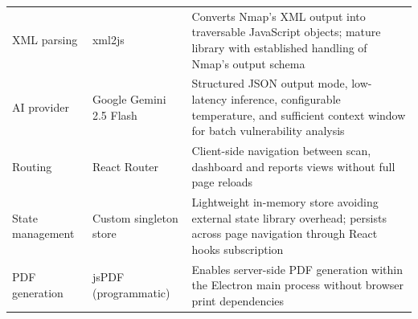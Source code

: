 \documentclass[12pt, a4paper, oneside]{report}
\begin{document}
\begin{table}[htbp]
\begin{tabularx}{\textwidth}{
    >{\raggedright\arraybackslash}p{2.2cm}
    >{\raggedright\arraybackslash}p{2.8cm}
    >{\raggedright\arraybackslash}X
}
\rowcolor{rowwhite}
XML parsing &
xml2js &
Converts Nmap's XML output into traversable JavaScript objects; mature library with established handling of Nmap's output schema \\

\rowcolor{rowlight}
AI provider &
Google Gemini 2.5 Flash &
Structured JSON output mode, low-latency inference, configurable temperature, and sufficient context window for batch vulnerability analysis \\

\rowcolor{rowwhite}
Routing &
React Router &
Client-side navigation between scan, dashboard and reports views without full page reloads \\

\rowcolor{rowlight}
State management &
Custom singleton store &
Lightweight in-memory store avoiding external state library overhead; persists across page navigation through React hooks subscription \\

\rowcolor{rowwhite}
PDF generation &
jsPDF (programmatic) &
Enables server-side PDF generation within the Electron main process without browser print dependencies \\
\bottomrule
\end{tabularx}
\renewcommand{\arraystretch}{1.0}
\end{table}
\end{document}
